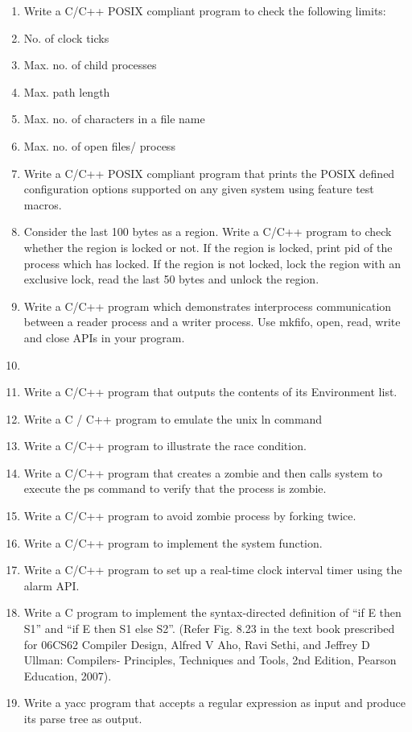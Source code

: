 \begin{enumerate}
\def\labelenumi{\arabic{enumi}.}
\item
  Write a C/C++ POSIX compliant program to check the following limits:
\item
  No. of clock ticks
\item
  Max. no. of child processes
\item
  Max. path length
\item
  Max. no. of characters in a file name
\item
  Max. no. of open files/ process
\item
  Write a C/C++ POSIX compliant program that prints the POSIX defined
  configuration options supported on any given system using feature test
  macros.
\item
  Consider the last 100 bytes as a region. Write a C/C++ program to
  check whether the region is locked or not. If the region is locked,
  print pid of the process which has locked. If the region is not
  locked, lock the region with an exclusive lock, read the last 50 bytes
  and unlock the region.
\item
  Write a C/C++ program which demonstrates interprocess communication
  between a reader process and a writer process. Use mkfifo, open, read,
  write and close APIs in your program.
\item
\item
  Write a C/C++ program that outputs the contents of its Environment
  list.
\item
  Write a C / C++ program to emulate the unix ln command
\item
  Write a C/C++ program to illustrate the race condition.
\item
  Write a C/C++ program that creates a zombie and then calls system to
  execute the ps command to verify that the process is zombie.
\item
  Write a C/C++ program to avoid zombie process by forking twice.
\item
  Write a C/C++ program to implement the system function.
\item
  Write a C/C++ program to set up a real-time clock interval timer using
  the alarm API.
\item
  Write a C program to implement the syntax-directed definition of ``if
  E then S1'' and ``if E then S1 else S2''. (Refer Fig. 8.23 in the text
  book prescribed for 06CS62 Compiler Design, Alfred V Aho, Ravi Sethi,
  and Jeffrey D Ullman: Compilers- Principles, Techniques and Tools, 2nd
  Edition, Pearson Education, 2007).
\item
  Write a yacc program that accepts a regular expression as input and
  produce its parse tree as output.
\end{enumerate}
